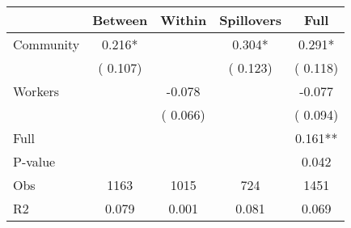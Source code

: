 
\begin{tabular}{l*{4}{c}}\hline&\multicolumn{1}{c}{Between}&\multicolumn{1}{c}{Within}&\multicolumn{1}{c}{Spillovers}&\multicolumn{1}{c}{Full}\\ \hline
 Community             &              0.216*      &                                               &        0.304* &         0.291*                            \\ 
                               &        (       0.107)           &                                       &       (       0.123)     &      (       0.118)                                           \\ 
 Workers       &                                               &       -0.078    &                                &            -0.077                            \\ 
                               &                                               & (       0.066)                  &                                        &      (       0.094)                                           \\ 
\hline                                                                                                                                                                                                                                            
 Full                  &                                               &                                               &                                        &             0.161**                                     \\ 
 P-value               &                                               &                                               &                                        &             0.042                                           \\ 
 Obs                   &               1163               &       1015                       &       724                &              1451                                               \\ 
 R2                    &                      0.079              &              0.001                      &              0.081               &                     0.069                                              \\ 
\hline \end{tabular}                                                                                                                                                                                                              